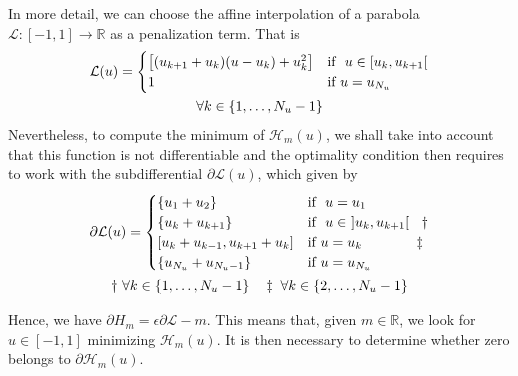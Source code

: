In more detail, we can choose the affine interpolation of a parabola $\mathcal{L}:[-1,1] \rightarrow \mathbb{R}$ as a penalization term. That is
\begin{gather}\label{PLP}
    \mathcal{L}(u) = \begin{cases}
        \big[ (u_{k+1}+u_{k}) (u-u_k) + u_k^2 \big] & \text{if }  u \in [u_k,u_{k+1}[ \\
        1 & \text{if } u = u_{N_u} 
    \end{cases} \\
    \notag \forall k \in \{1,\dots,N_u-1\}
\end{gather}
%
Nevertheless, to compute the minimum of $\mathcal{H}_m(u)$, we shall take into account that this function is not differentiable and the optimality condition then requires to work with the subdifferential $\partial\mathcal{L}(u)$, which given by
\begin{gather}
        \partial\mathcal{L}(u)= \begin{cases}
            \{u_1 + u_2  \}   & \text{if } \ u = u_1 \\
            \{u_k + u_{k+1}\}  & \text{if } \ u \in \ ]u_k,u_{k+1}[ \hspace{0.9em} \dagger\\
            [u_k+u_{k-1} ,  u_{k+1}+u_k] & \text{if} \ u = u_k \hspace{3.9em} \ddagger \\
            \{u_{N_u} + u_{N_u-1}  \} & \text{if} \ u = u_{N_u} 
       \end{cases} \\
       \notag \dagger \ \forall k \in \{1,\dots,N_u-1\} \hspace{1em}
       \notag \ddagger  \ \forall k \in \{2,\dots,N_u-1\}
\end{gather} 

Hence, we have $\partial H_m = \epsilon\partial \mathcal{L} - m$. This means that, given $m\in \mathbb{R}$, we look for $u \in [-1,1]$ minimizing $\mathcal{H}_m(u)$. It is then necessary to determine whether zero belongs to $\partial \mathcal{H}_m(u)$.

